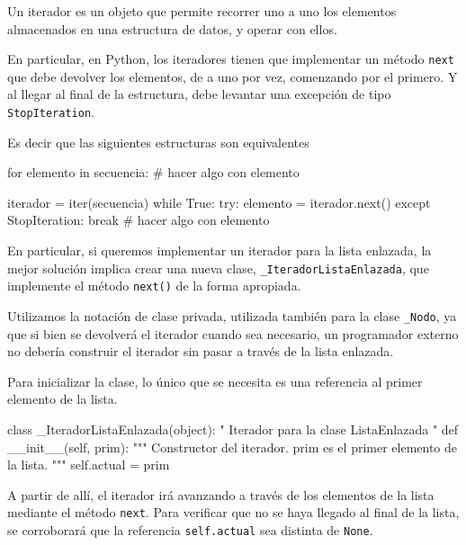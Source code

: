 \begin{observacion}
Un iterador es un objeto que permite recorrer uno a uno los elementos
almacenados en una estructura de datos, y operar con ellos.
\end{observacion}

En particular, en Python, los iteradores tienen que implementar un método
\lstinline!next! que debe devolver los elementos, de a uno por vez,
comenzando por el primero.  Y al llegar al final de la estructura, debe
levantar una excepción de tipo \lstinline!StopIteration!.

Es decir que las siguientes estructuras son equivalentes
\begin{codigo-python-sn}
for elemento in secuencia:
	# hacer algo con elemento
\end{codigo-python-sn}

\begin{codigo-python-sn}
iterador = iter(secuencia)
while True:
    try:
        elemento = iterador.next()
    except StopIteration:
        break
    # hacer algo con elemento
\end{codigo-python-sn}

En particular, si queremos implementar un iterador para la lista enlazada,
la mejor solución implica crear una nueva clase,
\lstinline!_IteradorListaEnlazada!, que implemente el método
\lstinline!next()! de la forma apropiada.

\begin{atencion}
Utilizamos la notación de clase privada, utilizada también para la clase
\lstinline!_Nodo!, ya que si bien se devolverá el iterador cuando sea
necesario, un programador externo no debería construir el iterador sin
pasar a través de la lista enlazada.
\end{atencion}

Para inicializar la clase, lo único que se necesita es una referencia al
primer elemento de la lista.

\begin{codigo-python-sn}
class _IteradorListaEnlazada(object):
    " Iterador para la clase ListaEnlazada "
    def __init__(self, prim):
        """ Constructor del iterador.
            prim es el primer elemento de la lista. """
        self.actual = prim
\end{codigo-python-sn}

A partir de allí, el iterador irá avanzando a través de los elementos de la
lista mediante el método \lstinline!next!.  Para verificar que no se haya
llegado al final de la lista, se corroborará que la referencia
\lstinline!self.actual! sea distinta de \lstinline!None!.

